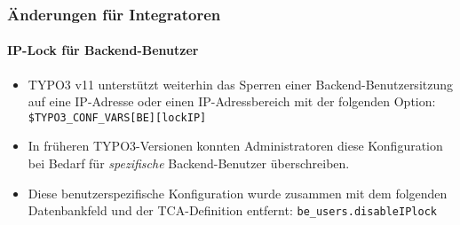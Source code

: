 %

\begin{frame}[fragile]
	\frametitle{Änderungen für Integratoren}
	\framesubtitle{IP-Lock für Backend-Benutzer}


	\begin{itemize}
		\item TYPO3 v11 unterstützt weiterhin das Sperren einer Backend-Benutzersitzung auf eine
			IP-Adresse oder einen IP-Adressbereich mit der folgenden Option:\newline
			\smaller\texttt{\$TYPO3\_CONF\_VARS[BE][lockIP]}\normalsize
		\item In früheren TYPO3-Versionen konnten Administratoren diese Konfiguration
			bei Bedarf für \textit{spezifische} Backend-Benutzer überschreiben.
		\item Diese benutzerspezifische Konfiguration wurde zusammen mit dem folgenden
			Datenbankfeld und der TCA-Definition entfernt:\newline
			\smaller\texttt{be\_users.disableIPlock}\normalsize
	\end{itemize}
\end{frame}

